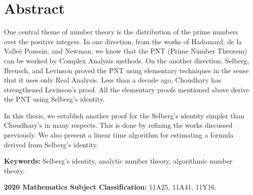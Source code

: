 \chapter*{Abstract}
One central theme of number theory is the distribution
of the prime numbers over the positive integers.
In one direction,
from the works of
Hadamard, de la Valle\'e Poussin, and Newman,
we know that the PNT (Prime Number Theorem)
can be worked by Complex Analysis methods.
On the another direction,
Selberg, Breusch, and Levinson proved the PNT
using elementary techniques in the sense that
it uses only Real Analysis.
Less than a decade ago,
Choudhary has strengthened Levinson's proof.
All the elementary proofs mentioned above
derive the PNT using Selberg's identity.

In this thesis,
we establish another proof for the Selberg's identity
simpler than Choudhary's in many respects.
This is done by refining the works discussed previously.
We also present a linear time algorithm for
estimating a formula derived from Selberg's identity.

\bigskip
\textbf{Keywords:}
Selberg's identity,
analytic number theory,
algorithmic number theory.

\bigskip
\textbf{2020 Mathematics Subject Classification:}
11A25,
11A41,
11Y16.
